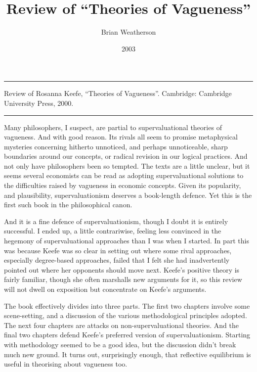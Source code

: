 \documentclass[
  10pt,
  letterpaper,
  DIV=11,
  numbers=noendperiod,
  twoside]{scrartcl}
\title{Review of ``Theories of Vagueness''}
\author{Brian Weatherson}
\date{2003}
\renewenvironment{abstract}
 {\vspace{-1.25cm}
 \quotation\small\noindent\rule{\linewidth}{.5pt}\par\smallskip
 \noindent }
 {\par\noindent\rule{\linewidth}{.5pt}\endquotation}
\begin{document}
\maketitle
\begin{abstract}
Review of Rosanna Keefe, ``Theories of Vagueness''. Cambridge: Cambridge
University Press, 2000.
\end{abstract}


Many philosophers, I suspect, are partial to supervaluational theories
of vagueness. And with good reason. Its rivals all seem to promise
metaphysical mysteries concerning hitherto unnoticed, and perhaps
unnoticeable, sharp boundaries around our concepts, or radical revision
in our logical practices. And not only have philosophers been so
tempted. The texts are a little unclear, but it seems several economists
can be read as adopting supervaluational solutions to the difficulties
raised by vagueness in economic concepts. Given its popularity, and
plausibility, supervaluationism deserves a book-length defence. Yet this
is the first such book in the philosophical canon.

And it is a fine defence of supervaluationism, though I doubt it is
entirely successful. I ended up, a little contrariwise, feeling less
convinced in the hegemony of supervaluational approaches than I was when
I started. In part this was because Keefe was so clear in setting out
where some rival approaches, especially degree-based approaches, failed
that I felt she had inadvertently pointed out where her opponents should
move next. Keefe's positive theory is fairly familiar, though she often
marshalls new arguments for it, so this review will not dwell on
exposition but concentrate on Keefe's arguments.

The book effectively divides into three parts. The first two chapters
involve some scene-setting, and a discussion of the various
methodological principles adopted. The next four chapters are attacks on
non-supervaluational theories. And the final two chapters defend Keefe's
preferred version of supervaluationism. Starting with methodology seemed
to be a good idea, but the discussion didn't break much new ground. It
turns out, surprisingly enough, that reflective equilibrium is useful in
theorising about vagueness too.
\end{document}
